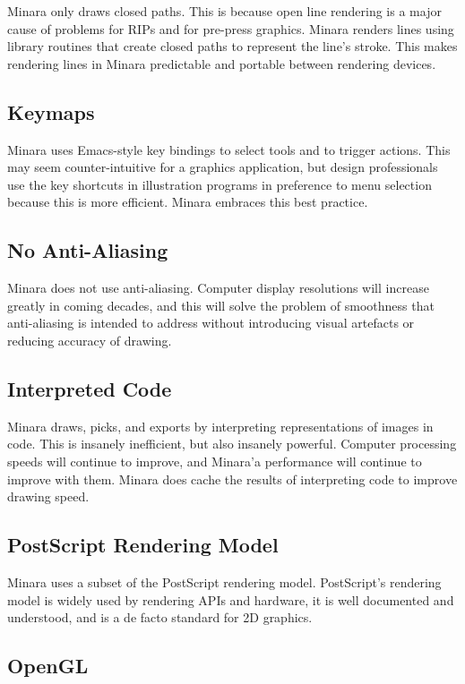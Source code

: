 Minara only draws closed paths. This is because open line rendering is a major cause of problems for RIPs and for pre-press graphics. Minara renders lines using library routines that create closed paths to represent the line's stroke. This makes rendering lines in Minara predictable and portable between rendering devices.

\subsection{Keymaps}

Minara uses Emacs-style key bindings to select tools and to trigger actions. This may seem counter-intuitive for a graphics application, but design professionals use the key shortcuts in illustration programs in preference to menu selection because this is more efficient. Minara embraces this best practice.

\subsection{No Anti-Aliasing}

Minara does not use anti-aliasing. Computer display resolutions will increase greatly in coming decades, and this will solve the problem of smoothness that anti-aliasing is intended to address without introducing visual artefacts or reducing accuracy of drawing.

\subsection{Interpreted Code}

Minara draws, picks, and exports by interpreting representations of images in code. This is insanely inefficient, but also insanely powerful. Computer processing speeds will continue to improve, and Minara'a performance will continue to improve with them. Minara does cache the results of interpreting code to improve drawing speed.

\subsection{PostScript Rendering Model}

Minara uses a subset of the PostScript rendering model. PostScript's rendering model is widely used by rendering APIs and hardware, it is well documented and understood, and is a de facto standard for 2D graphics.

\subsection{OpenGL}

